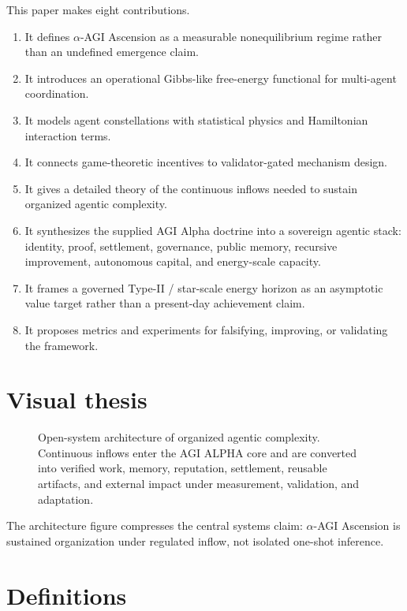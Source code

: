 \documentclass[
  11pt,
]{article}
\providecommand{\tightlist}{%
  \setlength{\itemsep}{0pt}\setlength{\parskip}{0pt}}
\begin{document}
This paper makes eight contributions.

\begin{enumerate}
\def\labelenumi{\arabic{enumi}.}
\tightlist
\item
  It defines $\alpha$-AGI Ascension as a measurable nonequilibrium regime
  rather than an undefined emergence claim.
\item
  It introduces an operational Gibbs-like free-energy functional for
  multi-agent coordination.
\item
  It models agent constellations with statistical physics and
  Hamiltonian interaction terms.
\item
  It connects game-theoretic incentives to validator-gated mechanism
  design.
\item
  It gives a detailed theory of the continuous inflows needed to sustain
  organized agentic complexity.
\item
  It synthesizes the supplied AGI Alpha doctrine into a sovereign
  agentic stack: identity, proof, settlement, governance, public memory,
  recursive improvement, autonomous capital, and energy-scale capacity.
\item
  It frames a governed Type-II / star-scale energy horizon as an
  asymptotic value target rather than a present-day achievement claim.
\item
  It proposes metrics and experiments for falsifying, improving, or
  validating the framework.
\end{enumerate}

\section{Visual thesis}\label{visual-thesis}

\begin{figure}
\centering
\resizebox{0.95\textwidth}{!}{}
\caption{Open-system architecture of organized agentic complexity.
Continuous inflows enter the AGI ALPHA core and are converted into
verified work, memory, reputation, settlement, reusable artifacts, and
external impact under measurement, validation, and adaptation.}
\end{figure}

The architecture figure compresses the central systems claim: $\alpha$-AGI Ascension is
sustained organization under regulated inflow, not isolated one-shot
inference.

\section{Definitions}\label{definitions}
\end{document}
